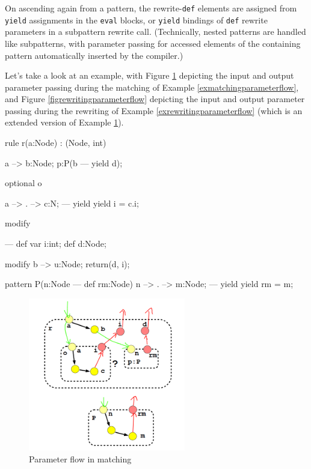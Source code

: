 On ascending again from a pattern, the rewrite-\texttt{def} elements are assigned from \texttt{yield} assignments in the \texttt{eval} blocks, or \texttt{yield} bindings of \texttt{def} rewrite parameters in a subpattern rewrite call.
(Technically, nested patterns are handled like subpatterns, with parameter passing for accessed elements of the containing pattern automatically inserted by the compiler.)

Let's take a look at an example, with Figure \ref{figmatchingparameterflow} depicting the input and output parameter passing during the matching of Example \ref{exmatchingparameterflow}, and Figure \ref{figrewritingparameterflow} depicting the input and output parameter passing during the rewriting of Example \ref{exrewritingparameterflow} (which is an extended version of Example \ref{figmatchingparameterflow}).

\begin{example}
  \begin{grgen}
rule r(a:Node) : (Node, int)
{
  a --> b:Node;
  p:P(b --- yield d);

  optional o {
    a --> . --> c:N;
  ---
    yield { yield i = c.i; }

    modify {
    }
  }
---	
  def var i:int;
  def d:Node;

  modify {
    b --> u:Node;
    return(d, i);
  }
}
pattern P(n:Node --- def rm:Node)
{
  n --> . --> m:Node;
---
  yield { yield rm = m; }
}
  \end{grgen}
\end{example}\label{exmatchingparameterflow}

\begin{figure}[hptb]
  \centering
  \includegraphics[width=0.61\textwidth]{fig/MatchAndParameterFlowAnnotated}
  \caption{Parameter flow in matching}
  \label{figmatchingparameterflow}
\end{figure}

